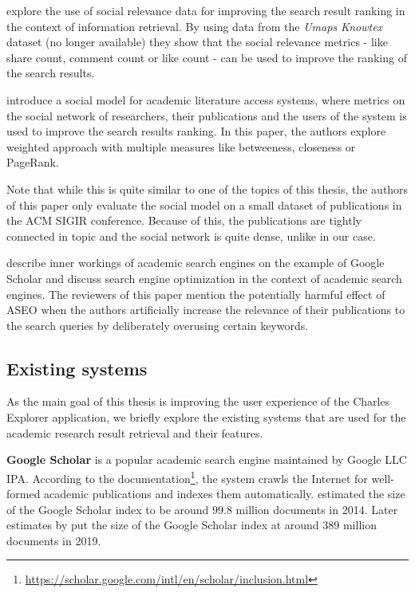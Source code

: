 \cite{social-relevance-for-re-ranking-documents} explore the use of social relevance data for improving the search result ranking in the context of information retrieval.
By using data from the \textit{Umaps Knowtex} dataset (no longer available) they show that the social relevance metrics - like share count, comment count or like count - can be used to improve the ranking of the search results.

\cite{social-model-literature-access} introduce a social model for academic literature access systems, 
where metrics on the social network of researchers, their publications and the users of the system is used to improve 
the search results ranking. In this paper, the authors explore weighted approach with multiple measures like betweeness, closeness or PageRank.

Note that while this is quite similar to one of the topics of this thesis, the authors of this paper
only evaluate the social model on a small dataset of publications in the \ac{ACM} \ac{SIGIR} conference.
Because of this, the publications are tightly connected in topic and the social network is quite dense, unlike in our case.

\cite{aseo} describe inner workings of academic search engines on the example of Google Scholar and
discuss search engine optimization in the context of academic search engines. 
The reviewers of this paper mention the potentially harmful effect of \ac{ASEO} when the authors artificially increase 
the relevance of their publications to the search queries by deliberately overusing certain keywords.

\subsection*{Existing systems}

As the main goal of this thesis is improving the user experience of the Charles Explorer application,
we briefly explore the existing systems that are used for the academic research result retrieval and their features.

\textbf{Google Scholar} is a popular academic search engine maintained by Google LLC IPA.
According to the documentation\footnote{\url{https://scholar.google.com/intl/en/scholar/inclusion.html}}, the system crawls the Internet for well-formed academic publications and indexes them automatically. 
\cite{google-scholar-size-estimation-2014} estimated the size of the Google Scholar index to be around $99.8$ million documents in 2014.
Later estimates by \cite{google-scholar-size} put the size of the Google Scholar index at around $389$ million documents in 2019.

